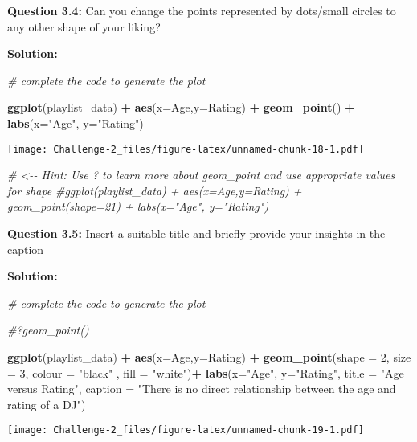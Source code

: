 \documentclass[
]{article}
\newenvironment{Shaded}{\begin{snugshade}}{\end{snugshade}}
\newcommand{\AttributeTok}[1]{\textcolor[rgb]{0.13,0.29,0.53}{#1}}
\newcommand{\CommentTok}[1]{\textcolor[rgb]{0.56,0.35,0.01}{\textit{#1}}}
\newcommand{\DecValTok}[1]{\textcolor[rgb]{0.00,0.00,0.81}{#1}}
\newcommand{\FunctionTok}[1]{\textcolor[rgb]{0.13,0.29,0.53}{\textbf{#1}}}
\newcommand{\NormalTok}[1]{#1}
\newcommand{\SpecialCharTok}[1]{\textcolor[rgb]{0.81,0.36,0.00}{\textbf{#1}}}
\newcommand{\StringTok}[1]{\textcolor[rgb]{0.31,0.60,0.02}{#1}}
\begin{document}
\textbf{Question 3.4:} Can you change the points represented by
dots/small circles to any other shape of your liking?

\textbf{Solution:}

\begin{Shaded}
\begin{Highlighting}[]
\CommentTok{\# complete the code to generate the plot}



\FunctionTok{ggplot}\NormalTok{(playlist\_data) }\SpecialCharTok{+} \FunctionTok{aes}\NormalTok{(}\AttributeTok{x=}\NormalTok{Age,}\AttributeTok{y=}\NormalTok{Rating) }\SpecialCharTok{+} \FunctionTok{geom\_point}\NormalTok{() }\SpecialCharTok{+}
  \FunctionTok{labs}\NormalTok{(}\AttributeTok{x=}\StringTok{"Age"}\NormalTok{, }\AttributeTok{y=}\StringTok{"Rating"}\NormalTok{)}
\end{Highlighting}
\end{Shaded}

\texttt{[image: Challenge-2\_files/figure-latex/unnamed-chunk-18-1.pdf]}

\begin{Shaded}
\begin{Highlighting}[]
\CommentTok{\# \textless{}{-}{-} Hint: Use ? to learn more about geom\_point and use appropriate values for shape}
\CommentTok{\#ggplot(playlist\_data) + aes(x=Age,y=Rating) + geom\_point(shape=21) + labs(x="Age", y="Rating")}
\end{Highlighting}
\end{Shaded}

\textbf{Question 3.5:} Insert a suitable title and briefly provide your
insights in the caption

\textbf{Solution:}

\begin{Shaded}
\begin{Highlighting}[]
\CommentTok{\# complete the code to generate the plot}

\CommentTok{\#?geom\_point()}

\FunctionTok{ggplot}\NormalTok{(playlist\_data) }\SpecialCharTok{+} \FunctionTok{aes}\NormalTok{(}\AttributeTok{x=}\NormalTok{Age,}\AttributeTok{y=}\NormalTok{Rating) }\SpecialCharTok{+} \FunctionTok{geom\_point}\NormalTok{(}\AttributeTok{shape =} \DecValTok{2}\NormalTok{, }\AttributeTok{size =} \DecValTok{3}\NormalTok{, }\AttributeTok{colour =} \StringTok{"black"}
\NormalTok{, }\AttributeTok{fill =} \StringTok{"white"}\NormalTok{)}\SpecialCharTok{+}
  \FunctionTok{labs}\NormalTok{(}\AttributeTok{x=}\StringTok{"Age"}\NormalTok{, }\AttributeTok{y=}\StringTok{"Rating"}\NormalTok{, }
       \AttributeTok{title =} \StringTok{"Age versus Rating"}\NormalTok{,}
       \AttributeTok{caption =} \StringTok{"There is no direct relationship between the age and rating of a DJ"}\NormalTok{)}
\end{Highlighting}
\end{Shaded}

\texttt{[image: Challenge-2\_files/figure-latex/unnamed-chunk-19-1.pdf]}
\end{document}

